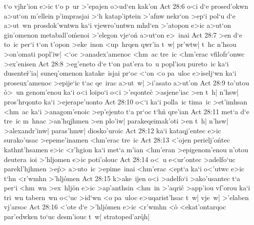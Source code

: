 t`o
vjhr'ion
e>ic
t`o
p~ur
>'epajen
o>ud`en
kak'on\bibvsend
\vs Act 28:6
o<i
d`e
prosed'okwn
a>ut`on
m'ellein
p'imprasjai
>`h
katap'iptein
>'afnw
nekr`on
>ep`i
pol`u
d`e
a>ut~wn
prosdok'wntwn
ka`i
vjewro'untwn
mhd`en
>'atopon
e>ic
a>ut`on
gin'omenon
metaball'o\r{m}enoi
>'elegon
vje`on\r{}
a>ut`on
e>~inai\bibvsend
\vs Act 28:7
>en
d`e
to~ic
per`i
t`on
t'opon
>eke~inon
<up~hrqen
qwr'ia
t~w|
pr'wtw|
t~hc
n'hsou
>on'omati
popl'iw|
<`oc
>anadex'amenoc
<hm~ac
tre~ic
<hm'erac
vfilofr'onwc
>ex'enisen\bibvsend
\vs Act 28:8
>eg'eneto
d`e
t`on
pat'era
to~u
popl'iou
pureto~ic
ka`i
dusente\r{r}'ia|
suneq'omenon
katake~isjai
pr`oc
<`on
<o
pa~uloc
e>iselj`wn
ka`i
proseux'amenoc
>epije`ic
t`ac
qe~irac
a>ut~w|
>i'asato
a>ut'on\bibvsend
\vs Act 28:9
to'utou
\r{o}>~un
genom'enou
ka`i
o<i
loipo`i
o<i
>'eqontec\r{}
>asjene'iac
>en
t~h|
n'hsw|
pros'hrqonto
ka`i
>ejerape'uonto\bibvsend
\vs Act 28:10
o<`i
ka`i
polla~ic
tima~ic
>et'imhsan
<hm~ac
ka`i
>anagom'enoic
>ep'ejento
t`a
pr`oc
t`hn\r{}
qre'ian\bibvsend
\vs Act 28:11
met`a
d`e
tre~ic
m~hnac
>an'hqjhmen
>en
plo'iw|
parakeqeimak'oti
>en
t~h|
n'hsw|
>alexandr'inw|
paras'hmw|
diosko'uroic\bibvsend
\vs Act 28:12
ka`i
kataqj'entec
e>ic
surako'usac
>epeme'inamen
<hm'erac
tre~ic\bibvsend
\vs Act 28:13
<'ojen
perielj'o\r{n}tec
kathnt'hsamen
e>ic
<r'hgion
ka`i
met`a
m'ian
<hm'eran
>epigenom'enou
n'otou
deutera~ioi
>'hljomen
e>ic
poti'olouc\bibvsend
\vs Act 28:14
o<~u
e<ur'ontec
>adelfo`uc
parekl'hjhmen
>e\r{p}>
a>uto~ic
>epime~inai
<hm'erac
<ept`a
ka`i
o<'utwc
e>ic
t`hn
<r'wmhn
>'hlj\r{o}men\bibvsend
{}
\vs Act 28:15
k>ake~ijen
o<i
>adelfo`i
>ako'usantec
t`a
per`i
<hm~wn
>ex~hlj\r{o}n
e>ic
>ap'anthsin
<hm~in
>'aqri\r{c}
>app'iou
vf'orou
ka`i
tri~wn
tabern~wn
o<`uc
>id`wn
<o
pa~uloc
e>uqarist'hsac
t~w|
vje~w|
>'elaben
vj'arsoc\bibvsend
\vs Act 28:16
<'ote
d`e
>'hlj\r{o}men
e>ic
<r'wmhn
<o\r{}
<ekat'ontarqoc
par'edwken
to`uc
desm'iouc
t~w|
stratoped'ar\r{q}h|
